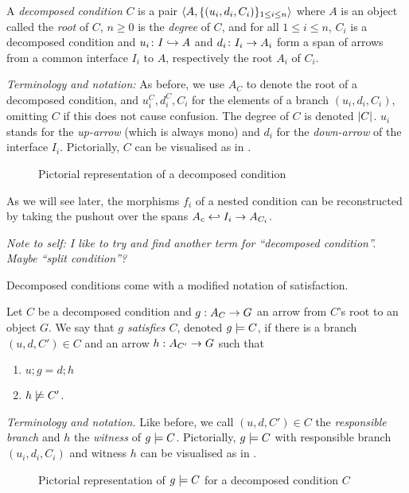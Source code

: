\begin{definition}
  A \emph{decomposed condition} $C$ is a pair $\langle{A,\{{(u_i,d_i,C_i)}\}_{1\leq i\leq n}}\rangle$ where $A$ is an object called the \emph{root} of $C$, $n\geq 0$ is the \emph{degree} of $C$, and for all $1\leq i\leq n$, $C_i$ is a decomposed condition and $u_i\colon I\hookrightarrow A$ and $d_i\colon I_i\rightarrow A_i$ form a span of arrows from a common interface $I_i$ to $A$, respectively the root $A_i$ of $C_i$.
\end{definition}
%
\emph{Terminology and notation:} As before, we use $A_C$ to denote the root of a decomposed condition, and $u^C_i,d^C_i,C_i$ for the elements of a branch $(u_i,d_i,C_i)$, omitting $C$ if this does not cause confusion. The degree of $C$ is denoted $|{C}|$. $u_i$ stands for the \emph{up-arrow} (which is always mono) and $d_i$ for the \emph{down-arrow} of the interface $I_i$. Pictorially, $C$ can be visualised as in .
%
\begin{figure}
  \centering
  
  \caption{Pictorial representation of a decomposed condition}
\end{figure}
%
As we will see later, the morphisms $f_i$ of a nested condition can be reconstructed by taking the pushout over the spans $A_c\hookleftarrow I_i\rightarrow A_{C_i}$.

\medskip\noindent\emph{Note to self: I like to try and find another term for ``decomposed condition''. Maybe ``split condition''?}

\medskip\noindent Decomposed conditions come with a modified notation of satisfaction.

\begin{definition}
  Let $C$ be a decomposed condition and $g:A_C\rightarrow G$ an arrow from $C$'s root to an object $G$. We say that \emph{$g$ satisfies $C$}, denoted $g\models C$, if there is a branch $(u,d,C')\in C$ and an arrow $h:A_{C'}\rightarrow G$ such that
  \begin{enumerate}
  \item $u;g=d;h$
  \item $h\not\models C'$.
  \end{enumerate}
\end{definition}
%

\emph{Terminology and notation.} Like before, we call $(u,d,C')\in C$ the \emph{responsible branch} and $h$ the \emph{witness} of $g\models C$. Pictorially, $g\models C$ with responsible branch $(u_i,d_i,C_i)$ and witness $h$ can be visualised as in .
%
\begin{figure}
  \centering
  
  \caption{Pictorial representation of $g\models C$ for a decomposed condition $C$}
\end{figure}


